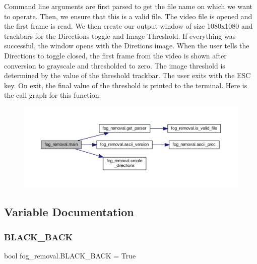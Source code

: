 Command line arguments are first parsed to get the file name on which we want to operate. Then, we ensure that this is a valid file. The video file is opened and the first frame is read. We then create our output window of size 1080x1080 and trackbars for the Directions toggle and Image Threshold. If everything was successful, the window opens with the Diretions image. When the user tells the Directions to toggle closed, the first frame from the video is shown after conversion to grayscale and thresholded to zero. The image threshold is determined by the value of the threshold trackbar. The user exits with the E\+SC key. On exit, the final value of the threshold is printed to the terminal. Here is the call graph for this function\+:\nopagebreak
\begin{figure}[H]
\begin{center}
\leavevmode
\includegraphics[width=350pt]{namespacefog__removal_a427a577da8405e5624962d7ef722aadf_cgraph}
\end{center}
\end{figure}


\subsection{Variable Documentation}
\mbox{\label{namespacefog__removal_ad88aa1ec890d366b2f2c71131bc1f657}} 
\subsubsection{\texorpdfstring{B\+L\+A\+C\+K\+\_\+\+B\+A\+CK}{BLACK\_BACK}}
{\footnotesize\ttfamily bool fog\+\_\+removal.\+B\+L\+A\+C\+K\+\_\+\+B\+A\+CK = True}

